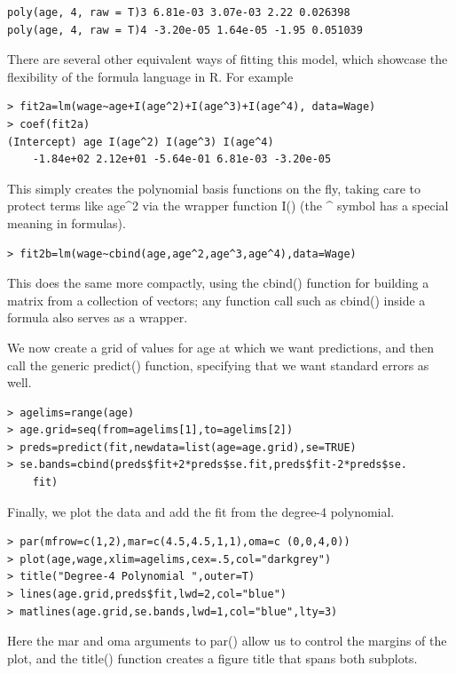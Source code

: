 \documentclass[10pt]{article}
\begin{document}
\begin{verbatim}
poly(age, 4, raw = T)3 6.81e-03 3.07e-03 2.22 0.026398
poly(age, 4, raw = T)4 -3.20e-05 1.64e-05 -1.95 0.051039
\end{verbatim}

There are several other equivalent ways of fitting this model, which showcase the flexibility of the formula language in R. For example

\begin{verbatim}
> fit2a=lm(wage~age+I(age^2)+I(age^3)+I(age^4), data=Wage)
> coef(fit2a)
(Intercept) age I(age^2) I(age^3) I(age^4)
    -1.84e+02 2.12e+01 -5.64e-01 6.81e-03 -3.20e-05
\end{verbatim}

This simply creates the polynomial basis functions on the fly, taking care to protect terms like age\^{}2 via the wrapper function I() (the \^{} symbol has a special meaning in formulas).

\begin{verbatim}
> fit2b=lm(wage~cbind(age,age^2,age^3,age^4),data=Wage)
\end{verbatim}

This does the same more compactly, using the cbind() function for building a matrix from a collection of vectors; any function call such as cbind() inside a formula also serves as a wrapper.

We now create a grid of values for age at which we want predictions, and then call the generic predict() function, specifying that we want standard errors as well.

\begin{verbatim}
> agelims=range(age)
> age.grid=seq(from=agelims[1],to=agelims[2])
> preds=predict(fit,newdata=list(age=age.grid),se=TRUE)
> se.bands=cbind(preds$fit+2*preds$se.fit,preds$fit-2*preds$se.
    fit)
\end{verbatim}

Finally, we plot the data and add the fit from the degree-4 polynomial.

\begin{verbatim}
> par(mfrow=c(1,2),mar=c(4.5,4.5,1,1),oma=c (0,0,4,0))
> plot(age,wage,xlim=agelims,cex=.5,col="darkgrey")
> title("Degree-4 Polynomial ",outer=T)
> lines(age.grid,preds$fit,lwd=2,col="blue")
> matlines(age.grid,se.bands,lwd=1,col="blue",lty=3)
\end{verbatim}

Here the mar and oma arguments to par() allow us to control the margins of the plot, and the title() function creates a figure title that spans both subplots.
\end{document}
